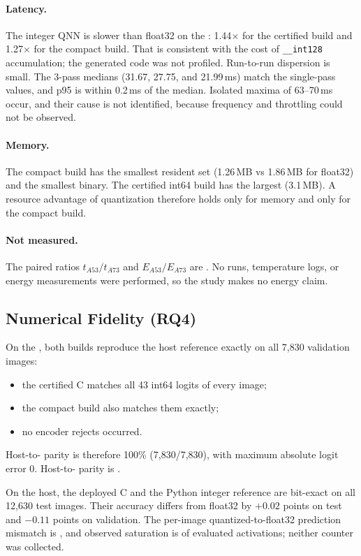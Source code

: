 \paragraph{Latency.}
The integer QNN is slower than float32 on the \Aseven{}: 1.44$\times$ for the certified build and 1.27$\times$ for the compact build. That is consistent with the cost of \texttt{\_\_int128} accumulation; the generated code was not profiled. Run-to-run dispersion is small. The 3-pass medians (31.67, 27.75, and 21.99\,ms) match the single-pass values, and p95 is within 0.2\,ms of the median. Isolated maxima of 63--70\,ms occur, and their cause is not identified, because frequency and throttling could not be observed.

\paragraph{Memory.}
The compact build has the smallest resident set (1.26\,MB vs 1.86\,MB for float32) and the smallest binary. The certified int64 build has the largest (3.1\,MB). A resource advantage of quantization therefore holds only for memory and only for the compact build.

\paragraph{Not measured.}
The paired ratios $t_{A53}/t_{A73}$ and $E_{A53}/E_{A73}$ are \TBD{}. No \Athree{} runs, temperature logs, or energy measurements were performed, so the study makes no energy claim.

\subsection{Numerical Fidelity (RQ4)}
On the \Aseven{}, both builds reproduce the host reference exactly on all 7,830 validation images:
\begin{itemize}
  \item the certified C matches all 43 int64 logits of every image;
  \item the compact build also matches them exactly;
  \item no encoder rejects occurred.
\end{itemize}
Host-to-\Aseven{} parity is therefore 100\% (7,830/7,830), with maximum absolute logit error 0. Host-to-\Athree{} parity is \TBD{\%}.

On the host, the deployed C and the Python integer reference are bit-exact on all 12,630 test images. Their accuracy differs from float32 by $+0.02$ points on test and $-0.11$ points on validation. The per-image quantized-to-float32 prediction mismatch is \TBD{\%}, and observed saturation is \TBD{\%} of evaluated activations; neither counter was collected.

